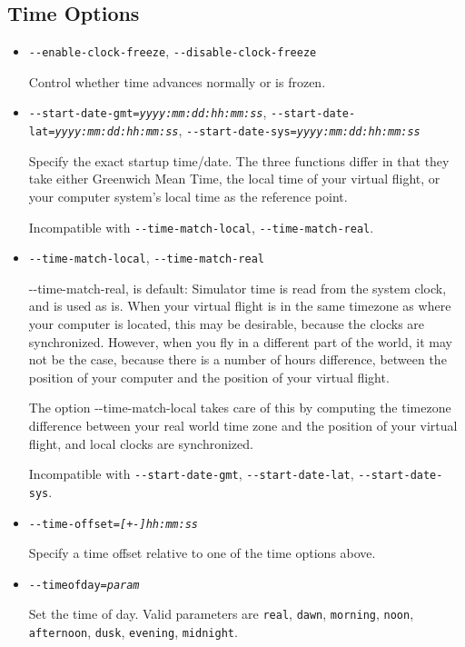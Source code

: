 \subsection{Time Options}
\begin{itemize}

\item{\texttt{-$ $-enable-clock-freeze}, \texttt{-$ $-disable-clock-freeze}}

Control whether time advances normally or is frozen.

\item{\texttt{-$ $-start-date-gmt={\it yyyy:mm:dd:hh:mm:ss}},
\texttt{-$ $-start-date-lat={\it yyyy:mm:dd:hh:mm:ss}}, \texttt{-$ $-start-date-sys={\it yyyy:mm:dd:hh:mm:ss}}}

Specify the exact startup time/date. The three functions differ in that they
take either Greenwich Mean Time, the local time of your virtual flight, or
your computer system's local time as the reference point.

Incompatible with \texttt{-$ $-time-match-local}, \texttt{-$ $-time-match-real}.

\item{\texttt{-$ $-time-match-local}, \texttt{-$ $-time-match-real}}

{-$ $-time-match-real}, is default: Simulator time is read from the system clock, and
is used as is. When your virtual flight is in the same timezone as where your computer
is located, this may be desirable, because the clocks are synchronized. However,
when you fly in a different part of the world, it may not be the case, because there
is a number of hours difference, between the position of your computer and the position of your
virtual flight.

The option {-$ $-time-match-local} takes care of this by computing the timezone
difference between your real world time zone and the position of your virtual
flight, and local clocks are synchronized.

Incompatible with \texttt{-$ $-start-date-gmt}, \texttt{-$ $-start-date-lat}, \texttt{-$ $-start-date-sys}.

\item{\texttt{-$ $-time-offset={\it [+-]hh:mm:ss}}}

Specify a time offset relative to one of the time options above.

\item{\texttt{-$ $-timeofday={\it param}}}

Set the time of day. Valid parameters are \texttt{real}, \texttt{dawn}, \texttt{morning},
\texttt{noon}, \texttt{afternoon}, \texttt{dusk}, \texttt{evening}, \texttt{midnight}.

\end{itemize}

